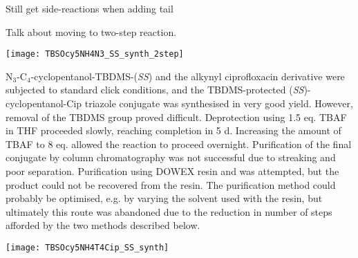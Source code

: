 Still get side-reactions when adding tail


Talk about moving to two-step reaction.

\begin{scheme}[H]
	\begin{center}
				
		\texttt{[image: TBSOcy5NH4N3\_SS\_synth\_2step]}
		\caption{
		a) , , , 0 $^{\circ}$C, 3 h.
		b) , DMF, , r.t., 3 h. 
		99.2 \% over 2 steps. %
		\label{sch:TBSOcy5NH4N3_SS_synth_2step}}
	\end{center}
\end{scheme}

N$_3$-C$_4$-cyclopentanol-TBDMS-(\textit{SS})  and the alkynyl ciprofloxacin derivative  were subjected to standard click conditions, and the TBDMS-protected (\textit{SS})-cyclopentanol-Cip triazole conjugate  was synthesised in very good yield. However, removal of the TBDMS group proved difficult. Deprotection using 1.5 eq. TBAF in THF proceeded slowly, reaching completion in 5 d. Increasing the amount of TBAF to 8 eq. allowed the reaction to proceed overnight.
Purification of the final conjugate  by column chromatography was not successful due to streaking and poor separation. Purification using DOWEX resin and  was attempted, but the product could not be recovered from the resin.
The purification method could probably be optimised, e.g. by varying the solvent used with the resin, but ultimately this route was abandoned due to the reduction in number of steps afforded by the two methods described below.

\begin{scheme}[H]
	\begin{center}
		\texttt{[image: TBSOcy5NH4T4Cip\_SS\_synth]}
		\caption{
		a) , sodium ascorbate, THPTA, , \textit{t}-BuOH, r.t., 87.4 \%. %
		b) TBAF, THF, r.t., 16 h. %
		\label{sch:TBSOcy5NH4T4Cip_SS_synth}}
	\end{center}
\end{scheme}

